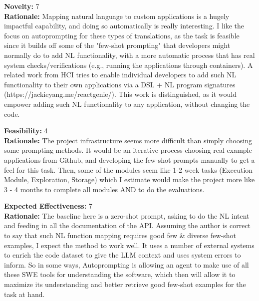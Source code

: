 \vspace{20pt}

\begin{tcolorbox}[colback=green!10!white, colframe=green!80!black, title=\textbf{Reviewer 2}]
\small
\textbf{Novelty:} 7\\
\textbf{Rationale:} Mapping natural language to custom applications is a hugely impactful capability, and doing so automatically is really interesting. I like the focus on autoprompting for these types of translations, as the task is feasible since it builds off some of the "few-shot prompting" that developers might normally do to add NL functionality, with a more automatic process that has real system checks/verifications (e.g., running the applications through containers). A related work from HCI tries to enable individual developers to add such NL functionality to their own applications via a DSL + NL program signatures (https://jackieyang.me/reactgenie/). This work is distinguished, as it would empower adding such NL functionality to any application, without changing the code.

\vspace{10pt}

\textbf{Feasibility:} 4\\
\textbf{Rationale:} The project infrastructure seems more difficult than simply choosing some prompting methods. It would be an iterative process choosing real example applications from Github, and developing the few-shot prompts manually to get a feel for this task. Then, some of the modules seem like 1-2 week tasks (Execution Module, Exploration, Storage) which I estimate would make the project more like 3 - 4 months to complete all modules AND to do the evaluations.

\vspace{10pt}

\textbf{Expected Effectiveness:} 7\\
\textbf{Rationale:} The baseline here is a zero-shot prompt, asking to do the NL intent and feeding in all the documentation of the API. Assuming the author is correct to say that such NL function mapping requires good few \& diverse few-shot examples, I expect the method to work well. It uses a number of external systems to enrich the code dataset to give the LLM context and uses system errors to inform. So in some ways, Autoprompting is allowing an agent to make use of all these SWE tools for understanding the software, which then will allow it to maximize its understanding and better retrieve good few-shot examples for the task at hand.


\end{tcolorbox}
